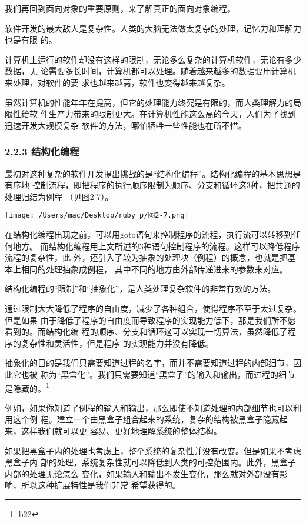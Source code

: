 \documentclass[11pt]{ctexart}
\begin{document}
我们再回到面向对象的重要原则，来了解真正的面向对象编程。

软件开发的最大敌人是复杂性。人类的大脑无法做太复杂的处理，记忆力和理解力也是有限
的。

计算机上运行的软件却没有这样的限制，无论多么复杂的计算机软件，无论有多少数据，无
论需要多长时间，计算机都可以处理。随着越来越多的数据要用计算机来处理，对软件的要
求也越来越高，软件也变得越来越复杂。

虽然计算机的性能年年在提高，但它的处理能力终究是有限的，而人类理解力的局限性给软
件生产力带来的限制更大。在计算机性能这么高的今天，人们为了找到迅速开发大规模复杂
软件的方法，哪怕牺牲一些性能也在所不惜。
\subsubsection{2.2.3 结构化编程}
\label{sec:org516ba6e}

最初对这种复杂的软件开发提出挑战的是“结构化编程”。结构化编程的基本思想是有序地
控制流程，即把程序的执行顺序限制为顺序、分支和循环这3种，把共通的处理归结为例程
（见图2-7）。
\begin{center}
\texttt{[image: /Users/mac/Desktop/ruby p/图2-7.png]}
\end{center}
在结构化编程出现之前，可以用goto语句来控制程序的流程，执行流可以转移到任何地方。
而结构化编程用上文所述的3种语句控制程序的流程。这样可以降低程序流程的复杂性，此
外，还引入了较为抽象的处理块（例程）的概念，也就是把基本上相同的处理抽象成例程，
其中不同的地方由外部传递进来的参数来对应。

结构化编程的“限制”和“抽象化”，是人类处理复杂软件的非常有效的方法。

通过限制大大降低了程序的自由度，减少了各种组合，使得程序不至于太过复杂。但是如果
由于降低了程序的自由度而导致程序的实现能力低下，那是我们所不愿看到的。而结构化编
程的顺序、分支和循环这可以实现一切算法，虽然降低了程序的复杂性和灵活性，但是程序
的实现能力并没有降低。

抽象化的目的是我们只需要知道过程的名字，而并不需要知道过程的内部细节，因此它也被
称为“黑盒化”。我们只需要知道“黑盒子”的输入和输出，而过程的细节是隐藏的。\footnote{b22}

例如，如果你知道了例程的输入和输出，那么即使不知道处理的内部细节也可以利用这个例
程。建立一个由黑盒子组合起来的系统，复杂的结构被黑盒子隐藏起来，这样我们就可以更
容易、更好地理解系统的整体结构。

如果把黑盒子内的处理也考虑上，整个系统的复杂性并没有改变。但是如果不考虑黑盒子内
部的处理，系统复杂性就可以降低到人类的可控范围内。此外，黑盒子内部的处理无论怎么
变化，如果输入和输出不发生变化，那么就对外部没有影响，所以这种扩展特性是我们非常
希望获得的。
\end{document}
